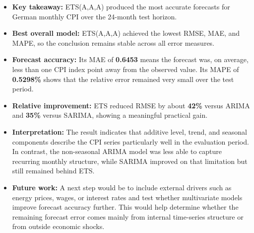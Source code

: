 \documentclass[25pt,a0paper,portrait]{tikzposter}
\begin{document}
\begin{columns}
{{		\vspace{1em}

		\begin{itemize}
			\item \textbf{Key takeaway:} ETS(A,A,A) produced the most accurate forecasts for German monthly CPI over the 24-month test horizon.

			\item \textbf{Best overall model:} ETS(A,A,A) achieved the lowest RMSE, MAE, and MAPE, so the conclusion remains stable across all error measures.

			\item \textbf{Forecast accuracy:} Its MAE of \textbf{0.6453} means the forecast was, on average, less than one CPI index point away from the observed value. Its MAPE of \textbf{0.5298\%} shows that the relative error remained very small over the test period.

			\item \textbf{Relative improvement:} ETS reduced RMSE by about \textbf{42\%} versus ARIMA and \textbf{35\%} versus SARIMA, showing a meaningful practical gain.

			\item \textbf{Interpretation:} The result indicates that additive level, trend, and seasonal components describe the CPI series particularly well in the evaluation period. In contrast, the non-seasonal ARIMA model was less able to capture recurring monthly structure, while SARIMA improved on that limitation but still remained behind ETS.

			\item \textbf{Future work:} A next step would be to include external drivers such as energy prices, wages, or interest rates and test whether multivariate models improve forecast accuracy further. This would help determine whether the remaining forecast error comes mainly from internal time-series structure or from outside economic shocks.
		\end{itemize}

		\vspace{0.4em}
	}
}

\end{columns}
\end{document}
